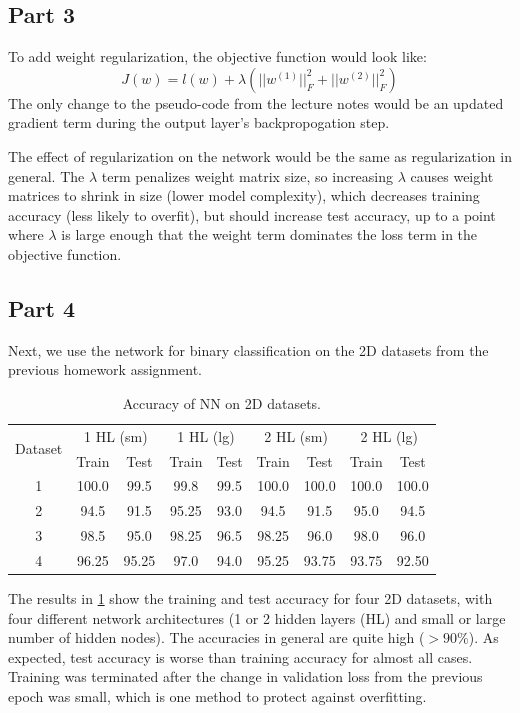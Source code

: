 \subsection{Part 3}
To add weight regularization, the objective function would look like:
\begin{equation}
J(w) = l(w) + \lambda(||w^{(1)}||^2_F + ||w^{(2)}||^2_F)
\end{equation}
The only change to the pseudo-code from the lecture notes would be an updated gradient term during the output layer's backpropogation step.

The effect of regularization on the network would be the same as regularization in general.
The $\lambda$ term penalizes weight matrix size, so increasing $\lambda$ causes weight matrices to shrink in size (lower model complexity), which decreases training accuracy (less likely to overfit), but should increase test accuracy, up to a point where $\lambda$ is large enough that the weight term dominates the loss term in the objective function.


\subsection{Part 4}
Next, we use the network for binary classification on the 2D datasets from the previous homework assignment.

\begin{table}[ht!]
\centering
\begin{tabular}{||c c c c c c c c c||}  
 \hline
 \multirow{2}{*}{Dataset} &
       \multicolumn{2}{c}{1 HL (sm)} &
       \multicolumn{2}{c}{1 HL (lg)} &
       \multicolumn{2}{c}{2 HL (sm)} &
       \multicolumn{2}{c||}{2 HL (lg)} \\
 & Train & Test & Train & Test & Train & Test & Train & Test \\ [0.5ex] 
 \hline\hline
 1 & 100.0 & 99.5 & 99.8 & 99.5 & 100.0 & 100.0 & 100.0 & 100.0 \\ \hline
 2 & 94.5 & 91.5 & 95.25 & 93.0 & 94.5 & 91.5 & 95.0 & 94.5 \\ \hline
 3 & 98.5 & 95.0 & 98.25 & 96.5 & 98.25 & 96.0 & 98.0 & 96.0 \\ \hline
 4 & 96.25 & 95.25 & 97.0 & 94.0 & 95.25 & 93.75 & 93.75 & 92.50 \\ \hline
\end{tabular}
\caption{Accuracy of NN on 2D datasets.}
\label{table_1_4}
\end{table}

The results in \cref{table_1_4} show the training and test accuracy for four 2D datasets, with four different network architectures (1 or 2 hidden layers (HL) and small or large number of hidden nodes).
The accuracies in general are quite high ($>90\%$).
As expected, test accuracy is worse than training accuracy for almost all cases.
Training was terminated after the change in validation loss from the previous epoch was small, which is one method to protect against overfitting.

